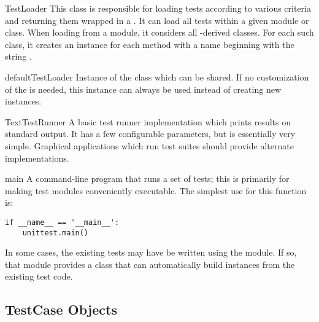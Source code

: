 \begin{classdesc}{TestLoader}{}
  This class is responsible for loading tests according to various
  criteria and returning them wrapped in a .
  It can load all tests within a given module or 
  class.  When loading from a module, it considers all
  -derived classes.  For each such class, it creates
  an instance for each method with a name beginning with the string
  .
\end{classdesc}

\begin{datadesc}{defaultTestLoader}
  Instance of the  class which can be shared.  If no
  customization of the  is needed, this instance can
  always be used instead of creating new instances.
\end{datadesc}

\begin{classdesc}{TextTestRunner}{}
  A basic test runner implementation which prints results on standard
  output.  It has a few configurable parameters, but is essentially
  very simple.  Graphical applications which run test suites should
  provide alternate implementations.
\end{classdesc}

\begin{funcdesc}{main}{}
  A command-line program that runs a set of tests; this is primarily
  for making test modules conveniently executable.  The simplest use
  for this function is:

\begin{verbatim}
if __name__ == '__main__':
    unittest.main()
\end{verbatim}
\end{funcdesc}

In some cases, the existing tests may have be written using the
 module.  If so, that module provides a 
 class that can automatically build
 instances from the existing test code.


\subsection{TestCase Objects
            \label{testcase-objects}}

